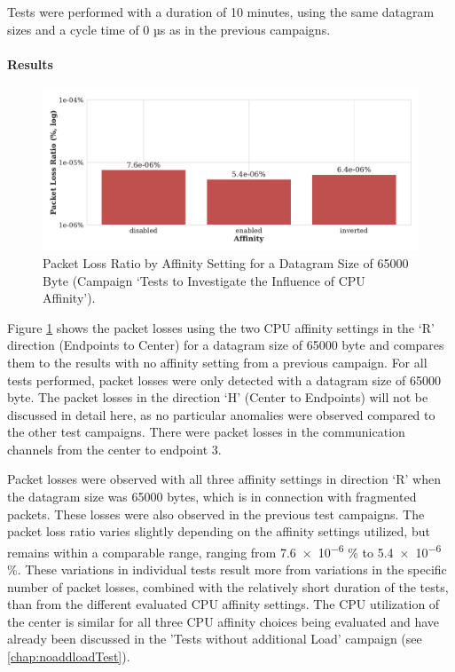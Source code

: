 Tests were performed with a duration of 10 minutes, using the same datagram sizes and a cycle time of 0 µs as in the previous campaigns.

\paragraph{Results}

\begin{figure}[h]
    \centering
    \includegraphics[width=1\linewidth]{figures/reliability/ihawk/diagr9.pdf}
    \caption{Packet Loss Ratio by Affinity Setting for a Datagram Size of 65000 Byte (Campaign `Tests to Investigate the Influence of CPU Affinity').}
    \label{fig:diagr9Loss}
\end{figure}

Figure \ref{fig:diagr9Loss} shows the packet losses using the two CPU affinity settings in the `R' direction (Endpoints to Center) for a datagram size of 65000 byte and compares them to the results with no affinity setting from a previous campaign. For all tests performed, packet losses were only detected with a datagram size of 65000 byte. The packet losses in the direction `H' (Center to Endpoints) will not be discussed in detail here, as no particular anomalies were observed compared to the other test campaigns. There were packet losses in the communication channels from the center to endpoint 3.

Packet losses were observed with all three affinity settings in direction `R' when the datagram size was 65000 bytes, which is in connection with fragmented packets. These losses were also observed in the previous test campaigns.  The packet loss ratio varies slightly depending on the affinity settings utilized, but remains within a comparable range, ranging from \num{7.6e-6} \%  to \num{5.4e-6} \%. These variations in individual tests result more from variations in the specific number of packet losses, combined with the relatively short duration of the tests, than from the different evaluated CPU affinity settings. The CPU utilization of the center is similar for all three CPU affinity choices being evaluated and have already been discussed in the 'Tests without additional Load' campaign (see \ref{chap:noaddloadTest}).

